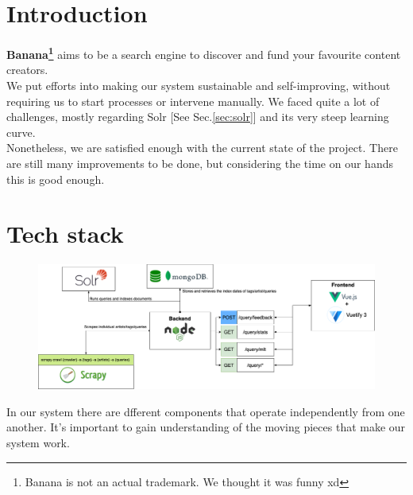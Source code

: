 \documentclass[tikz,14pt]{article}
\newcommand\sitename{Banana\texttrademark}
\begin{document}






\section{Introduction} \label{sec:intro}
\textbf{\sitename\footnote{Banana is not an actual trademark. We thought it was funny xd}} aims to be a search engine to discover and fund your favourite content creators.\\
We put efforts into making our system sustainable and self-improving, without requiring us to start processes or intervene manually. We faced quite a lot of challenges, mostly regarding Solr [See Sec.\ref{sec:solr}] and its very steep learning curve.\\
Nonetheless, we are satisfied enough with the current state of the project. There are still many improvements to be done, but considering the time on our hands this is good enough.\\


\section{Tech stack} \label{sec:stack}
\begin{figure}[h!]
    \includegraphics*[width=\linewidth]{fig/StackDiagram.png}
\end{figure}
In our system there are dfferent components that operate independently from one another. It's important to gain understanding of the moving pieces that make our system work.
\end{document}
